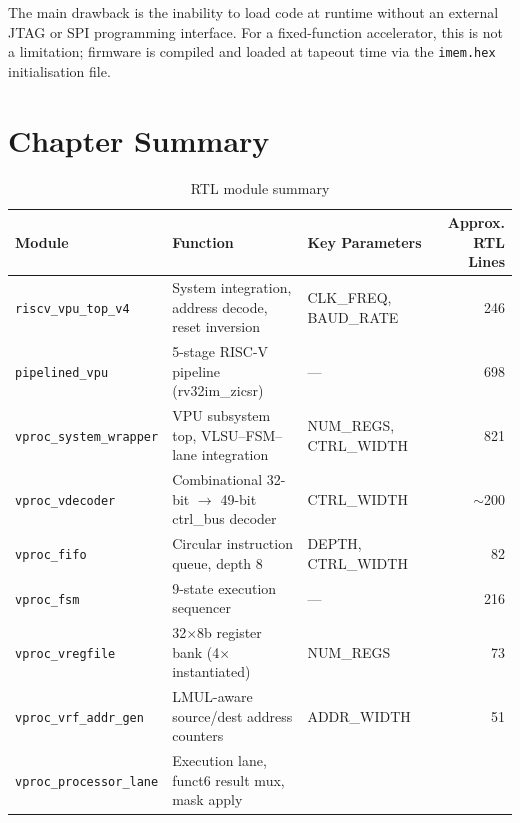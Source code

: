 The main drawback is the inability to load code at runtime without an external JTAG
or SPI programming interface. For a fixed-function accelerator, this is not a
limitation; firmware is compiled and loaded at tapeout time via the \texttt{imem.hex}
initialisation file.

\section{Chapter Summary}
\label{sec:hw_summary}

\begin{table}[H]
\centering
\caption{RTL module summary}
\label{tab:module_summary}
\begin{tabular}{p{4.5cm}p{4.5cm}p{3.5cm}r}
\toprule
\textbf{Module} & \textbf{Function} & \textbf{Key Parameters} & \textbf{Approx. RTL Lines} \\
\midrule
\texttt{riscv\_vpu\_top\_v4}      & System integration, address decode, reset inversion
                                   & CLK\_FREQ, BAUD\_RATE  & 246  \\
\texttt{pipelined\_vpu}           & 5-stage RISC-V pipeline (rv32im\_zicsr)
                                   & ---                    & 698  \\
\texttt{vproc\_system\_wrapper}   & VPU subsystem top, VLSU–FSM–lane integration
                                   & NUM\_REGS, CTRL\_WIDTH & 821  \\
\texttt{vproc\_vdecoder}          & Combinational 32-bit $\to$ 49-bit ctrl\_bus decoder
                                   & CTRL\_WIDTH            & $\sim$200 \\
\texttt{vproc\_fifo}              & Circular instruction queue, depth 8
                                   & DEPTH, CTRL\_WIDTH     & 82   \\
\texttt{vproc\_fsm}               & 9-state execution sequencer
                                   & ---                    & 216  \\
\texttt{vproc\_vregfile}          & 32$\times$8b register bank (4$\times$ instantiated)
                                   & NUM\_REGS              & 73   \\
\texttt{vproc\_vrf\_addr\_gen}    & LMUL-aware source/dest address counters
                                   & ADDR\_WIDTH            & 51   \\
\texttt{vproc\_processor\_lane}   & Execution lane, funct6 result mux, mask apply

\end{tabular}
\end{table}
